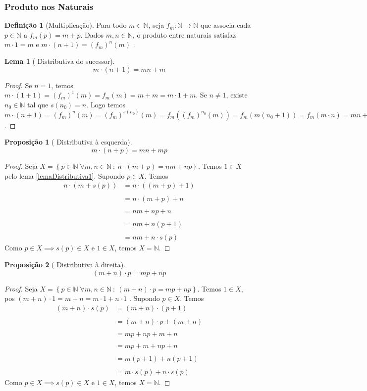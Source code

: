 \documentclass{article}
\theoremstyle{plain}
\newtheorem{prop}{Proposição}[section]
\newtheorem{lema}{Lema}
\theoremstyle{definition}
\newtheorem{definicao}{Definição}[section]
\theoremstyle{remark}
\begin{document}
\subsubsection{Produto nos Naturais}
\begin{definicao}[Multiplicação]
	Para todo $m\in \mathbb{N}$, seja $f_m : \mathbb{N} \to \mathbb{N}$ que associa cada $p\in \mathbb{N}$ a $f_m(p) = m+p$.
	Dados $m,n \in \mathbb{N}$, o produto entre naturais satisfaz $m\cdot 1 = m$ e  $ m\cdot (n+1) = (f_m)^n(m)$ .
\end{definicao}
\begin{lema}[ Distributiva do sucessor]
	$$m\cdot(n+1) = mn +m$$
\end{lema}
\begin{proof}
	\label{lemaDistributiva1}
	Se $n = 1$, temos  $m\cdot(1+1) = (f_m)^1(m) = f_m(m) = m+m = m\cdot 1 +m$. Se $n\neq 1$, existe $n_0\in \mathbb{N}$ tal que $s(n_0) = n$. Logo temos $m\cdot( n +1) = (f_m)^{n}(m) = (f_m)^{s(n_0)}(m) =   f_m( (f_m)^{n_0} (m)) = f_m( m(n_0+1)) = f_m(m \cdot n ) =  mn+m$.
\end{proof}
\begin{prop}[ Distributiva à esquerda]
	$$m\cdot(n+p) = mn +mp$$
\end{prop}
\begin{proof}
	Seja $X = \left\{p \in \mathbb{N} | \forall m,n \in \mathbb{N} \: : \:  n\cdot(m+p) = nm + np\right\}$. Temos $1\in X$ pelo lema \ref{lemaDistributiva1}. Supondo $p\in X$. Temos \begin{align*}
		n\cdot(m+s(p)) &= n\cdot ((m+p)+1)  \\~\\
		&= n\cdot(m+p) + n\\~\\
		&= nm+np+n\\~\\
		&=nm+n(p+1)\\~\\
		&=nm+n\cdot s(p)
	\end{align*}
	Como $p\in X\implies s(p) \in X $ e $1\in X$, temos $X = \mathbb{N}$.
\end{proof}
\begin{prop}[ Distributiva à direita]
	$$(m+n)\cdot p = mp +np$$
\end{prop}
\begin{proof}
	Seja $X = \left\{p \in \mathbb{N} | \forall m,n \in \mathbb{N} \: : \:  (m+n)\cdot p = mp + np\right\}$. Temos $1\in X$, pos $(m+n)\cdot 1 = m+n = m\cdot 1 + n \cdot 1$ . Supondo $p\in X$. Temos \begin{align*}
		(m+n)\cdot s(p) &= (m+n)\cdot(p+1)  \\~\\
		&= (m+n)\cdot p + (m+n)\\~\\
		&= mp+np+m+n\\~\\
		&=mp+m+ np+n\\~\\
		&=m(p+1)+ n(p+1)\\~\\
		&=m\cdot s(p) + n\cdot s(p)
	\end{align*}
	Como $p\in X\implies s(p) \in X $ e $1\in X$, temos $X = \mathbb{N}$.
\end{proof}
\end{document}
